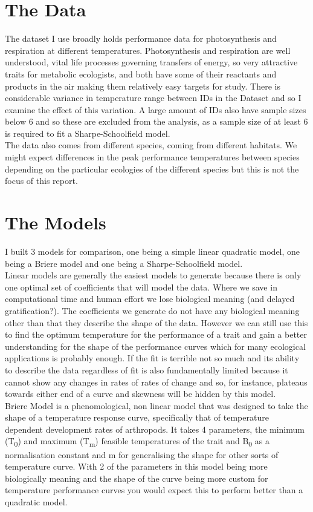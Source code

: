 \documentclass[12pt]{article}
\begin{document}
  \section{The Data}
  The dataset I use broadly holds performance data for photosynthesis and respiration at different temperatures. 
  Photosynthesis and respiration are well understood, vital life processes governing transfers of energy, so very attractive traits for metabolic ecologists,
  and both have some of their reactants and products in the air making them relatively easy targets for study. There is considerable variance 
  in temperature range between IDs in the Dataset and so I examine the effect of this variation. 
  A large amount of IDs also have sample sizes below 6 
  and so these are excluded from the analysis, as a sample size of at least 6 is required to fit a Sharpe-Schoolfield model. \\
  The data also comes from different species, coming from different habitats. We might expect differences in the peak performance 
  temperatures between species depending on the particular ecologies of the different species but this is not the focus 
  of this report. \\
 
  \section{The Models}
  I built 3 models for comparison, one being a simple linear quadratic model, one being a Briere model and one being a Sharpe-Schoolfield model.\\
  Linear models are generally the easiest models to generate because there is only one optimal set of coefficients that will model the data. 
  Where we save in computational time and human effort we lose biological meaning (and delayed gratification?). The coefficients we generate 
  do not have any biological meaning other than that they describe the shape of the data. However we can still use this to find the optimum 
  temperature for the performance of a trait and gain a better understanding for the shape of the performance curves which for many ecological 
  applications is probably enough. If the fit is terrible not so much and its ability to describe the data regardless of fit is also 
  fundamentally limited because it cannot show any changes in rates of rates of change and so, for instance, plateaus towards either end of a 
  curve and skewness will be hidden by this model.\\
  Briere Model \cite{Brierea} is a phenomological, non linear model that was designed to take the shape of a temperature response curve, 
  specifically that of temperature dependent development rates of arthropods. It takes 4 parameters, the minimum (T\textsubscript{0}) and maximum (T\textsubscript{m}) 
  feasible temperatures of the trait and B\textsubscript{0} as a normalisation constant and m for generalising the shape for other sorts of temperature
  curve. With 2 of the parameters in this model being more biologically meaning and the shape of the curve being more custom for temperature
  performance curves you would expect this to perform better than a quadratic model.\\
\end{document}
